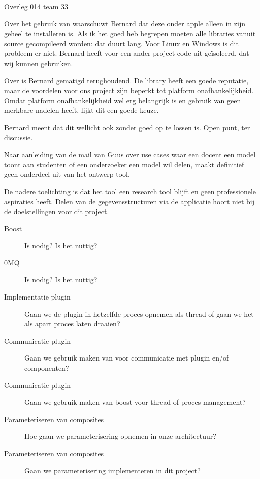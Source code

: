 \documentclass[a4paper,final]{article}
\begin{document}
\begin{Minutes}{Overleg 014 team 33}
\begin{description}
\end{description}


 Over het gebruik van  waarschuwt Bernard dat deze
onder apple alleen in zijn geheel te installeren is. Als ik het goed heb
begrepen moeten alle  libraries vanuit source gecompileerd worden: dat
duurt lang.  Voor Linux en Windows is dit probleem er niet. Bernard heeft voor
een ander project code uit  ge\"{i}soleerd, dat wij kunnen gebruiken.

 Over  is Bernard gematigd terughoudend. De library
heeft een goede reputatie, maar de voordelen voor ons project zijn beperkt tot
platform onafhankelijkheid.  Omdat platform onafhankelijkheid wel erg
belangrijk is en gebruik van  geen merkbare nadelen heeft, lijkt dit een
goede keuze.

Bernard meent dat dit wellicht ook zonder  goed op te lossen is. Open
punt, ter discussie.

 Naar aanleiding van de mail van Guus
over use cases waar een docent een model toont aan studenten of een onderzoeker
een model wil delen, maakt definitief geen onderdeel uit van het ontwerp tool.

De nadere toelichting is dat het tool een research tool blijft en geen
professionele aspiraties heeft. Delen van de gegevensstructuren via de
applicatie hoort niet bij de doelstellingen voor dit project.


\begin{description} 
	
	\item[Boost] Is  nodig? Is het nuttig?

	\item[0MQ] Is  nodig? Is het nuttig?

	\item[Implementatie plugin] Gaan we de plugin in hetzelfde proces opnemen
		als thread of gaan we het als apart proces laten draaien? 

	\item[Communicatie plugin] Gaan we gebruik maken van  voor
		communicatie met plugin en/of componenten?

	\item[Communicatie plugin] Gaan we gebruik maken van boost voor thread of
		proces management?

	\item[Parameteriseren van composites] Hoe gaan we parameterisering opnemen
		in onze architectuur?

	\item[Parameteriseren van composites] Gaan we parameterisering
		implementeren in dit project?

\end{description}

\end{Minutes}
\end{document}
